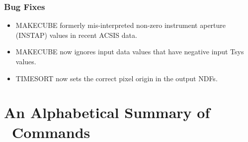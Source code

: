 \documentclass[oneside,11pt]{starlink}
\begin{document}
\subsubsection*{Bug Fixes}

\begin{itemize}
\item MAKECUBE formerly mis-interpreted non-zero instrument aperture (INSTAP) values in recent ACSIS data.
\item MAKECUBE now ignores input data values that have negative input Tsys values.
\item TIMESORT now sets the correct pixel origin in the output NDFs.
\end{itemize}

\newpage

\appendix
\ifpdf

\section{An Alphabetical Summary of \SMURF\ Commands
\label{ap:summary}}
\end{document}
